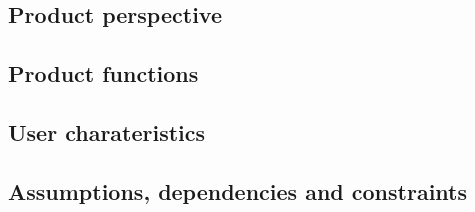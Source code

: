 \subsection{Product perspective}
\subsection{Product functions}
\subsection{User charateristics}
\subsection{Assumptions, dependencies and constraints}


